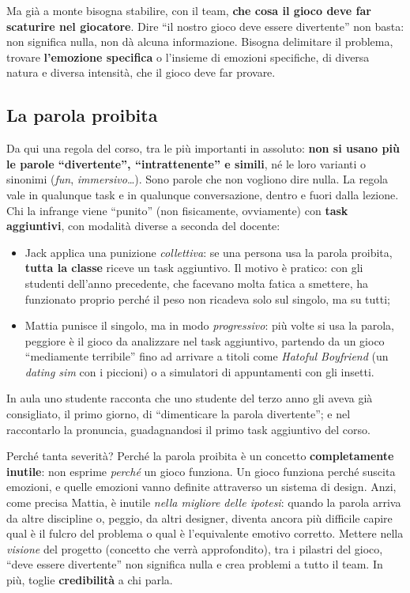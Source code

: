 Ma già a monte bisogna stabilire, con il team, \textbf{che cosa il gioco deve
far scaturire nel giocatore}. Dire ``il nostro gioco deve essere divertente''
non basta: non significa nulla, non dà alcuna informazione. Bisogna delimitare
il problema, trovare \textbf{l'emozione specifica} o l'insieme di emozioni
specifiche, di diversa natura e diversa intensità, che il gioco deve far
provare.

\subsection{La parola proibita}

Da qui una regola del corso, tra le più importanti in assoluto: \textbf{non si
usano più le parole ``divertente'', ``intrattenente'' e simili}, né le loro
varianti o sinonimi (\emph{fun}, \emph{immersivo}\dots). Sono parole che non
vogliono dire nulla. La regola vale in qualunque task e in qualunque
conversazione, dentro e fuori dalla lezione. Chi la infrange viene ``punito''
(non fisicamente, ovviamente) con \textbf{task aggiuntivi}, con modalità
diverse a seconda del docente:
\begin{itemize}
  \item Jack applica una punizione \emph{collettiva}: se una persona usa la
        parola proibita, \textbf{tutta la classe} riceve un task aggiuntivo. Il
        motivo è pratico: con gli studenti dell'anno precedente, che facevano
        molta fatica a smettere, ha funzionato proprio perché il peso non
        ricadeva solo sul singolo, ma su tutti;
  \item Mattia punisce il singolo, ma in modo \emph{progressivo}: più volte si
        usa la parola, peggiore è il gioco da analizzare nel task aggiuntivo,
        partendo da un gioco ``mediamente terribile'' fino ad arrivare a titoli
        come \emph{Hatoful Boyfriend} (un \emph{dating sim} con i piccioni) o
        a simulatori di appuntamenti con gli insetti.
\end{itemize}
In aula uno studente racconta che uno studente del terzo anno gli aveva già
consigliato, il primo giorno, di ``dimenticare la parola divertente''; e
nel raccontarlo la pronuncia, guadagnandosi il primo task aggiuntivo del
corso.

Perché tanta severità? Perché la parola proibita è un concetto
\textbf{completamente inutile}: non esprime \emph{perché} un gioco funziona.
Un gioco funziona perché suscita emozioni, e quelle emozioni vanno definite
attraverso un sistema di design. Anzi, come precisa Mattia, è inutile
\emph{nella migliore delle ipotesi}: quando la parola arriva da altre
discipline o, peggio, da altri designer, diventa ancora più difficile capire
qual è il fulcro del problema o qual è l'equivalente emotivo corretto. Mettere
nella \emph{visione} del progetto (concetto che verrà approfondito), tra i
pilastri del gioco, ``deve essere divertente'' non significa nulla e crea
problemi a tutto il team. In più, toglie \textbf{credibilità} a chi parla.

